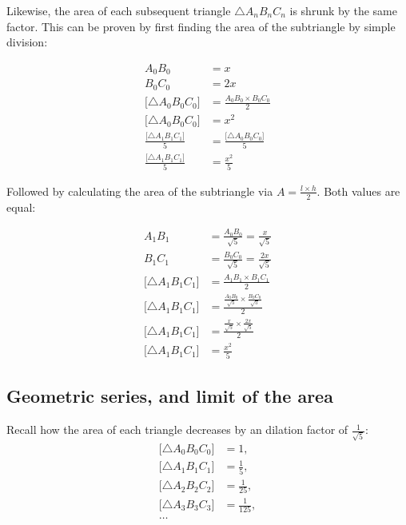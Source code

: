 \noindent
Likewise, the area of each subsequent triangle $\triangle A_{n}B_{n}C_{n}$ is shrunk by the same factor. This can be proven by first finding the area of the subtriangle by simple division:

\begin{equation}
    \begin{aligned}
        A_{0}B_{0} &= x \\
        B_{0}C_{0} &= 2x \\
        \big[\triangle A_{0}B_{0}C_{0}\big] &= \frac{A_{0}B_{0} \times B_{0}C_{0}}{2} \\
        \big[\triangle A_{0}B_{0}C_{0}\big] &= x^2 \\
        \frac{\big[\triangle A_{1}B_{1}C_{1}\big]}{5} &= \frac{\big[\triangle A_{0}B_{0}C_{0}\big]}{5} \\
        \frac{\big[\triangle A_{1}B_{1}C_{1}\big]}{5} &= \frac{x^2}{5}
    \end{aligned}
\end{equation}

\noindent
Followed by calculating the area of the subtriangle via $A = \frac{l\times h}{2}$. Both values are equal:

\begin{equation}
    \begin{aligned}
        A_{1}B_{1} &= \frac{A_{0}B_{0}}{\sqrt{5}} = \frac{x}{\sqrt{5}}\\
        B_{1}C_{1} &= \frac{B_{0}C_{0}}{\sqrt{5}} = \frac{2x}{\sqrt{5}}\\
        \big[\triangle A_{1}B_{1}C_{1}\big] &= \frac{A_{1}B_{1} \times B_{1}C_{1}}{2} \\
        \big[\triangle A_{1}B_{1}C_{1}\big] &=  \frac{\frac{A_{0}B_{0}}{\sqrt{5}} \times \frac{B_{0}C_{0}}{\sqrt{5}}}{2} \\
        \big[\triangle A_{1}B_{1}C_{1}\big] &=  \frac{\frac{x}{\sqrt{5}} \times \frac{2x}{\sqrt{5}}}{2} \\
        \big[\triangle A_{1}B_{1}C_{1}\big] &=  \frac{x^2}{5}
    \end{aligned}
\end{equation}

\subsection{Geometric series, and limit of the area}
Recall how the area of each triangle decreases by an dilation factor of $\frac{1}{\sqrt{5}}$:
\begin{equation}
    \begin{aligned}
        \big[\triangle A_{0}B_{0}C_{0}\big] &= 1,\\
        \big[\triangle A_{1}B_{1}C_{1}\big] &= \frac{1}{5},\\
        \big[\triangle A_{2}B_{2}C_{2}\big] &= \frac{1}{25},\\
        \big[\triangle A_{3}B_{3}C_{3}\big] &= \frac{1}{125},\\
        \ldots
    \end{aligned}
\end{equation}

